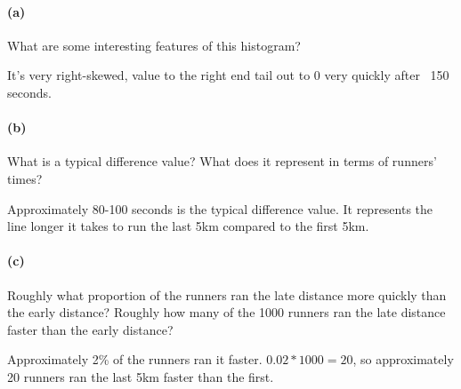     \paragraph*{(a)} 
    What are some interesting features of this histogram?

    \begin{mdframed}
        It's very right-skewed, value to the right end tail out to 0 very quickly after ~150 seconds.
    \end{mdframed}

    \paragraph*{(b)}
    What is a typical difference value? What does it represent in terms of runners' times?

    \begin{mdframed}
        Approximately 80-100 seconds is the typical difference value. It represents the line longer it takes to run the last 5km compared to the first 5km.
    \end{mdframed}

    \paragraph*{(c)}
    Roughly what proportion of the runners ran the late distance more quickly than the early distance? Roughly how many of the 1000 runners ran the late distance faster than the early distance?

    \begin{mdframed}
        Approximately 2\% of the runners ran it faster. $0.02 * 1000 = 20$, so approximately 20 runners ran the last 5km faster than the first.  
    \end{mdframed}

